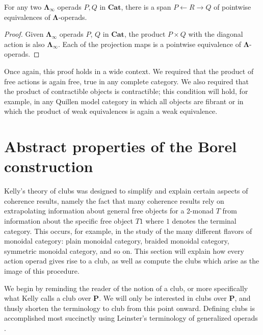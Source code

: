 \documentclass{amsbook} %
\newcommand{\mb}{\mathbf}
\numberwithin{section}{chapter}
\begin{document}
\begin{prop}
For any two $\mb{\Lambda}_{\infty}$ operads $P,Q$ in $\mb{Cat}$, there is a span $P \leftarrow R \rightarrow Q$  of pointwise equivalences of $\mb{\Lambda}$-operads.
\end{prop}
\begin{proof}
Given $\mb{\Lambda}_{\infty}$ operads $P$, $Q$ in $\mb{Cat}$, the product $P \times Q$ with the diagonal action is also $\mb{\Lambda}_{\infty}$.  Each of the projection maps is a pointwise equivalence of $\mb{\Lambda}$-operads.
\end{proof}
\begin{rem}
Once again, this proof holds in a wide context.  We required that the product of free actions is again free, true in any complete category.  We also required that the product of contractible objects is contractible; this condition will hold, for example, in any Quillen model category in which all objects are fibrant or in which the product of weak equivalences is again a weak equivalence.
\end{rem}


\section{Abstract properties of the Borel construction}

Kelly's theory of clubs \cite{kelly_club1, kelly_club0, kelly_club2} was designed to simplify and explain certain aspects of coherence results, namely the fact that many coherence results rely on extrapolating information about general free objects for a 2-monad $T$ from information about the specific free object $T1$ where $1$ denotes the terminal category.  This occurs, for example, in the study of the many different flavors of monoidal category:  plain monoidal category, braided monoidal category, symmetric monoidal category, and so on.  This section will explain how every action operad gives rise to a club, as well as compute the clubs which arise as the image of this procedure.

We begin by reminding the reader of the notion of a club, or more specifically what Kelly \cite{kelly_club1,kelly_club2} calls a club over $\mb{P}$.  We will only be interested in clubs over $\mb{P}$, and thusly shorten the terminology to club from this point onward.  Defining clubs is accomplished most succinctly using Leinster's terminology of generalized operads \cite{leinster}.
\end{document}
